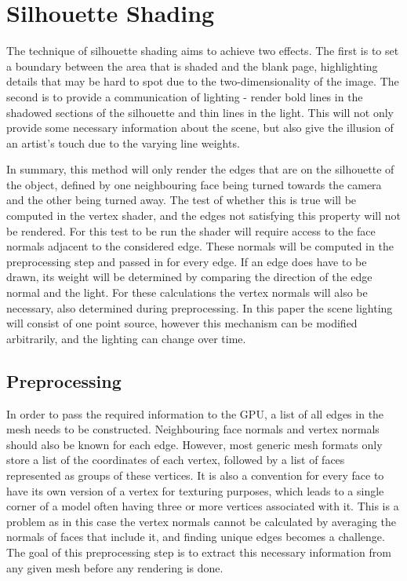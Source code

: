 \documentclass[a4paper, 12pt]{article}
\begin{document}

\section{Silhouette Shading}

The technique of silhouette shading aims to achieve two effects. The first is to set a boundary between the area that is shaded and the blank page, highlighting details that may be hard to spot due to the two-dimensionality of the image. The second is to provide a communication of lighting - render bold lines in the shadowed sections of the silhouette and thin lines in the light. This will not only provide some necessary information about the scene, but also give the illusion of an artist's touch due to the varying line weights.

In summary, this method will only render the edges that are on the silhouette of the object, defined by one neighbouring face being turned towards the camera and the other being turned away. The test of whether this is true will be computed in the vertex shader, and the edges not satisfying this property will not be rendered. For this test to be run the shader will require access to the face normals adjacent to the considered edge. These normals will be computed in the preprocessing step and passed in for every edge. If an edge does have to be drawn, its weight will be determined by comparing the direction of the edge normal and the light. For these calculations the vertex normals will also be necessary, also determined during preprocessing. In this paper the scene lighting will consist of one point source, however this mechanism can be modified arbitrarily, and the lighting can change over time.

\subsection{Preprocessing}
In order to pass the required information to the GPU, a list of all edges in the mesh needs to be constructed. Neighbouring face normals and vertex normals should also be known for each edge. However, most generic mesh formats only store a list of the coordinates of each vertex, followed by a list of faces represented as groups of these vertices. It is also a convention for every face to have its own version of a vertex for texturing purposes, which leads to a single corner of a model often having three or more vertices associated with it. This is a problem as in this case the vertex normals cannot be calculated by averaging the normals of faces that include it, and finding unique edges becomes a challenge. The goal of this preprocessing step is to extract this necessary information from any given mesh before any rendering is done.
\end{document}

